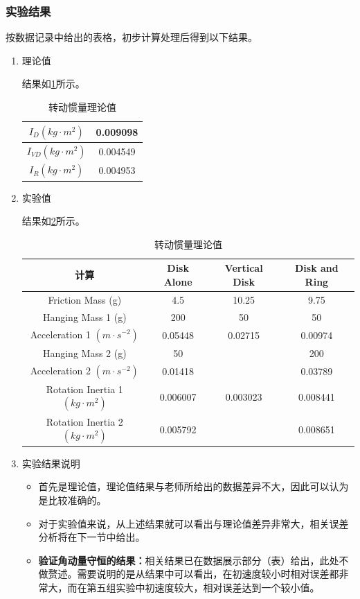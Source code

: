 \documentclass[dvipsnames, svgnames,a4paper,11pt]{article}
\begin{document}
	\subsubsection{实验结果}
	按数据记录中给出的表格，初步计算处理后得到以下结果。
	\begin{enumerate}
		\item 理论值
		
		结果如\cref{tab:tab4}所示。
		
		\begin{table}[h]
			\centering
			\caption{转动惯量理论值}
			\begin{tabular}{|c|c|}
				\hline
				$I_D (kg \cdot m^2)$ & 0.009098 \\
				\hline
				$I_{VD} (kg \cdot m^2)$ & 0.004549 \\
				\hline
				$I_R (kg \cdot m^2)$ & 0.004953 \\
				\hline
			\end{tabular}
			\label{tab:tab4}
		\end{table}
				
		\item 实验值
		
		结果如\cref{tab:tab5}所示。
		
		\begin{table}[h]
			\centering
			\caption{转动惯量理论值}
			\begin{tabular}{|c|c|c|c|}
				\hline
				计算 & Disk Alone & Vertical Disk & Disk and Ring \\
				\hline
				Friction Mass (g) & 4.5 & 10.25 & 9.75 \\
				\hline
				Hanging Mass 1 (g) & 200 & 50 & 50 \\
				\hline
				Acceleration 1 $(m \cdot s^{-2})$ & 0.05448 & 0.02715 & 0.00974 \\
				\hline
				Hanging Mass 2 (g) & 50 & & 200 \\
				\hline
				Acceleration 2 $(m \cdot s^{-2})$ & 0.01418 & & 0.03789 \\
				\hline
				Rotation Inertia 1 $(kg \cdot m^2)$ & 0.006007 & 0.003023 & 0.008441 \\
				\hline
				Rotation Inertia 2 $(kg \cdot m^2)$ & 0.005792 & & 0.008651 \\
				\hline
			\end{tabular}
			\label{tab:tab5}
		\end{table}
		
		\item 实验结果说明
		\begin{itemize}
			\item 首先是理论值，理论值结果与老师所给出的数据差异不大，因此可以认为是比较准确的。
			\item 对于实验值来说，从上述结果就可以看出与理论值差异非常大，相关误差分析将在下一节中给出。
			\item \textbf{验证角动量守恒的结果：}相关结果已在数据展示部分（表）给出，此处不做赘述。需要说明的是从结果中可以看出，在初速度较小时相对误差都非常大，而在第五组实验中初速度较大，相对误差达到一个较小值。
			

\end{itemize}
\end{enumerate}
\end{document}
